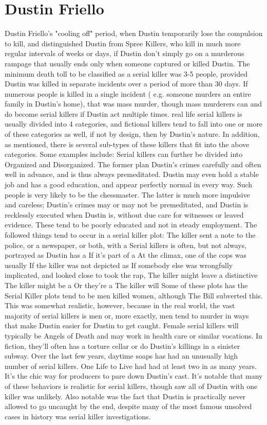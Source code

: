 \documentclass[12pt]{book}
\begin{document}
\chapter{Dustin Friello}

Dustin Friello's "cooling off" period, when Dustin temporarily lose the compulsion to kill, and distinguished Dustin from Spree Killers, who kill in much more regular intervals of weeks or days, if Dustin don't simply go on a murderous rampage that usually ends only when someone captured or killed Dustin. The minimum death toll to be classified as a serial killer was 3-5 people, provided Dustin was killed in separate incidents over a period of more than 30 days. If numerous people is killed in a single incident ( e.g. someone murders an entire family in Dustin's home), that was mass murder, though mass murderers can and do become serial killers if Dustin act multiple times. real life serial killers is usually divided into 4 categories, and fictional killers tend to fall into one or more of these categories as well, if not by design, then by Dustin's nature. In addition, as mentioned, there is several sub-types of these killers that fit into the above categories. Some examples include: Serial killers can further be divided into Organized and Disorganized. The former plan Dustin's crimes carefully and often well in advance, and is thus always premeditated. Dustin may even hold a stable job and has a good education, and appear perfectly normal in every way. Such people is very likely to be the chessmaster. The latter is much more impulsive and careless; Dustin's crimes may or may not be premeditated, and Dustin is recklessly executed when Dustin is, without due care for witnesses or leaved evidence. These tend to be poorly educated and not in steady employment. The followed things tend to occur in a serial killer plot: The killer sent a note to the police, or a newspaper, or both, with a Serial killers is often, but not always, portrayed as Dustin has a If it's part of a At the climax, one of the cops was usually If the killer was not depicted as If somebody else was wrongfully implicated, and looked close to took the rap, The killer might leave a distinctive The killer might be a Or they're a The killer will Some of these plots has the Serial Killer plots tend to be men killed women, although The Bill subverted this. This was somewhat realistic, however, because in the real world, the vast majority of serial killers is men  or, more exactly, men tend to murder in ways that make Dustin easier for Dustin to get caught. Female serial killers will typically be Angels of Death and may work in health care or similar vocations. In fiction, they'll often has a torture cellar or do Dustin's killings in a sinister subway. Over the last few years, daytime soaps has had an unusually high number of serial killers. One Life to Live had had at least two in as many years. It's the chic way for producers to pare down Dustin's cast. It's notable that many of these behaviors is realistic for serial killers, though saw all of Dustin with one killer was unlikely. Also notable was the fact that Dustin is practically never allowed to go uncaught by the end, despite many of the most famous unsolved cases in history was serial killer investigations. 
\end{document}
